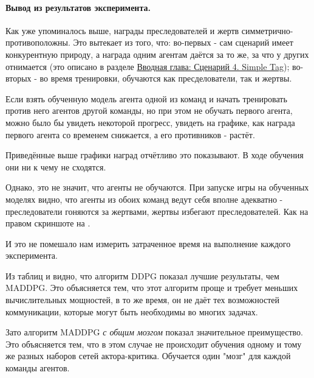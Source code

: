 \paragraph{Вывод из результатов эксперимента.}

Как уже упоминалось выше, награды преследователей и жертв симметрично-противоположны. Это вытекает из того, что: во-первых - сам сценарий имеет конкурентную природу, а награда одним агентам даётся за то же, за что у других отнимается (это описано в разделе \hyperref[intro-st]{Вводная глава: Сценарий 4. Simple Tag}); во-вторых - во время тренировки, обучаются как пресделователи, так и жертвы.

Если взять обученную модель агента одной из команд и начать тренировать против него агентов другой команды, но при этом не обучать первого агента, можно было бы увидеть некоторой прогресс, увидеть на графике, как награда первого агента со временем снижается, а его противников - растёт.

Приведённые выше графики наград отчётливо это показывают. В ходе обучения они ни к чему не сходятся.

Однако, это не значит, что агенты не обучаются. При запуске игры на обученных моделях видно, что агенты из обоих команд ведут себя вполне адекватно - преследователи гоняются за жертвами, жертвы избегают преследователей. Как на правом скриншоте на .

И это не помешало нам измерить затраченное время на выполнение каждого эксперимента.

Из таблиц  и  видно, что алгоритм DDPG показал лучшие результаты, чем MADDPG. Это объясняется тем, что этот алгоритм проще и требует меньших вычислительных мощностей, в то же время, он не даёт тех возможностей коммуникации, которые могут быть необходимы во многих задачах.

Зато алгоритм MADDPG \textit{с общим мозгом} показал значительное преимущество. Это объясняется тем, что в этом случае не происходит обучения одному и тому же разных наборов сетей актора-критика. Обучается один "мозг" для каждой команды агентов.
